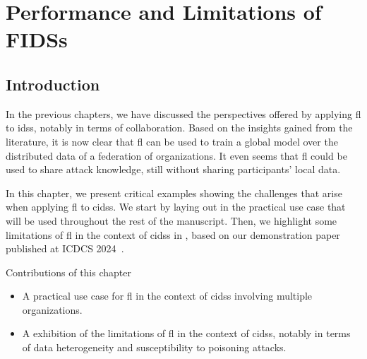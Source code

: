 \chapter{Performance and Limitations of FIDSs\label{chap:app}}

\section{Introduction\label{sec:app.intro}}

In the previous chapters, we have discussed the perspectives offered by applying \gls{fl} to \glspl{ids}, notably in terms of collaboration.
Based on the insights gained from the literature, it is now clear that \gls{fl} can be used to train a global model over the distributed data of a federation of organizations.
It even seems that \gls{fl} could be used to share attack knowledge, still without sharing participants' local data.

In this chapter, we present critical examples showing the challenges that arise when applying \gls{fl} to \glspl{cids}.
We start by laying out in  the practical use case that will be used throughout the rest of the manuscript.
Then, we highlight some limitations of \gls{fl} in the context of \glspl{cids} in , based on our demonstration paper published at ICDCS 2024~\cite{lavaur_icdcs_demo_2024}.

\begin{highlightbox}{Contributions of this chapter}
  \begin{itemize}[\textbullet, leftmargin=*, labelsep=10pt]
    \item A practical use case for \gls{fl} in the context of \glspl{cids} involving multiple organizations.
    \item A exhibition of the limitations of \gls{fl} in the context of \glspl{cids}, notably in terms of data heterogeneity and susceptibility to poisoning attacks.
  \end{itemize}
\end{highlightbox}






%


